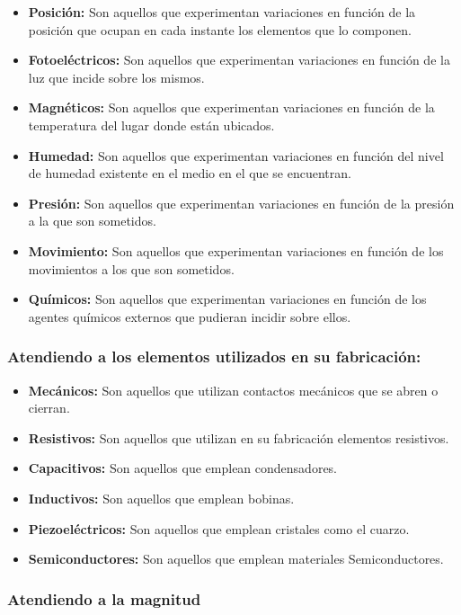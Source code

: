 \begin{itemize}
 \item \textbf{Posición:} Son aquellos que experimentan variaciones en función de la posición que ocupan en cada instante los elementos que lo componen.
 \item \textbf{Fotoeléctricos:} Son aquellos que experimentan variaciones en función de la luz que incide sobre los mismos.
 \item \textbf{Magnéticos:} Son aquellos que experimentan variaciones en función de la temperatura del lugar donde están ubicados.
 \item \textbf{Humedad:} Son aquellos que experimentan variaciones en función del nivel de humedad existente en el medio en el que se encuentran.
 \item \textbf{Presión:} Son aquellos que experimentan variaciones en función de la presión a la que son sometidos.
 \item \textbf{Movimiento:} Son aquellos que experimentan variaciones en función de los movimientos a los que son sometidos.
 \item \textbf{Químicos:} Son aquellos que experimentan variaciones en función de los agentes químicos externos que pudieran incidir sobre ellos.
\end{itemize}

\subsubsection{Atendiendo a los elementos utilizados en su fabricación:}

\begin{itemize}
 \item \textbf{Mecánicos:} Son aquellos que utilizan contactos mecánicos que se abren o cierran.
 \item \textbf{Resistivos:} Son aquellos que utilizan en su fabricación elementos resistivos.
 \item \textbf{Capacitivos:} Son aquellos que emplean condensadores.
 \item \textbf{Inductivos:} Son aquellos que emplean bobinas.
 \item \textbf{Piezoeléctricos:} Son aquellos que emplean cristales como el cuarzo.
 \item \textbf{Semiconductores:} Son aquellos que emplean materiales Semiconductores.
\end{itemize}


\subsubsection{Atendiendo a la magnitud}

